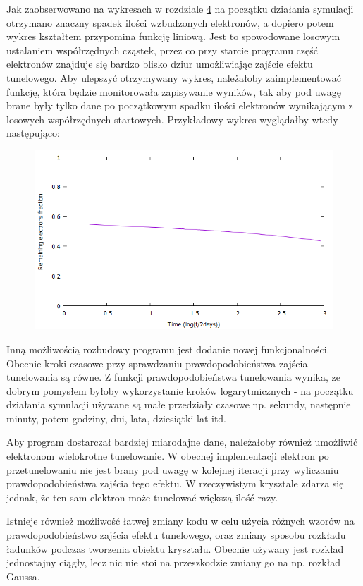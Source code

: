 Jak zaobserwowano na wykresach w rozdziale \hyperref[wynik:wykres]{4} na początku działania symulacji otrzymano znaczny spadek ilości wzbudzonych elektronów, a dopiero potem wykres kształtem przypomina funkcję liniową. Jest to spowodowane losowym ustalaniem współrzędnych cząstek, przez co przy starcie programu część elektronów znajduje się bardzo blisko dziur umożliwiając zajście efektu tunelowego. Aby ulepszyć otrzymywany wykres, należałoby zaimplementować funkcję, która będzie monitorowała zapisywanie wyników, tak aby pod uwagę brane były tylko dane po początkowym spadku ilości elektronów wynikającym z losowych współrzędnych startowych. Przykładowy wykres wyglądałby wtedy następująco:
\begin{figure}[h]
\centering
\includegraphics[width=17cm]{przyklad_ulepszony}
\end{figure}

Inną możliwością rozbudowy programu jest dodanie nowej funkcjonalności. Obecnie kroki czasowe przy sprawdzaniu prawdopodobieństwa zajścia tunelowania są równe. Z funkcji prawdopodobieństwa tunelowania wynika, ze dobrym pomysłem byłoby wykorzystanie kroków logarytmicznych - na początku działania symulacji używane są małe przedziały czasowe np. sekundy, następnie minuty, potem godziny, dni, lata, dziesiątki lat itd.

Aby program dostarczał bardziej miarodajne dane, należałoby również umożliwić elektronom wielokrotne tunelowanie. W obecnej implementacji elektron po przetunelowaniu nie jest brany pod uwagę w kolejnej iteracji przy wyliczaniu prawdopodobieństwa zajścia tego efektu. W rzeczywistym krysztale zdarza się jednak, że ten sam elektron może tunelować większą ilość razy.

Istnieje również możliwość łatwej zmiany kodu w celu użycia różnych wzorów na prawdopodobieństwo zajścia efektu tunelowego, oraz zmiany sposobu rozkładu ładunków podczas tworzenia obiektu kryształu. Obecnie używany jest rozkład jednostajny ciągły, lecz nic nie stoi na przeszkodzie zmiany go na np. rozkład Gaussa. 